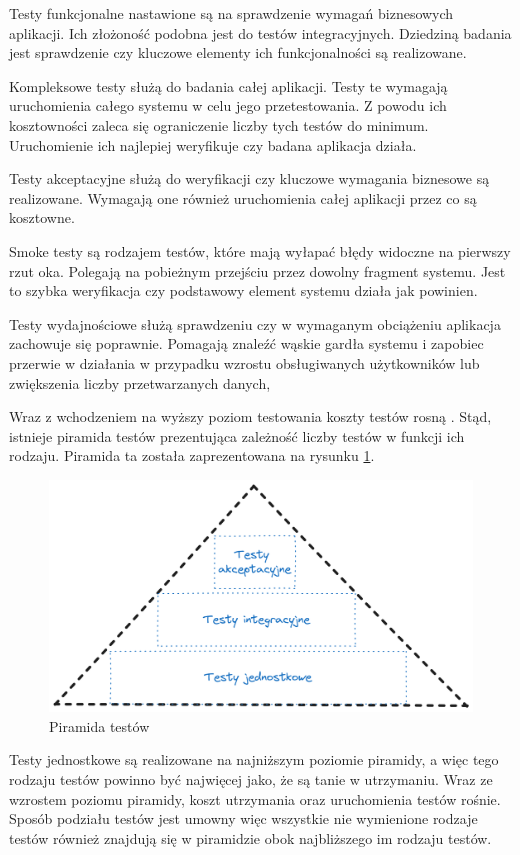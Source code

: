 Testy funkcjonalne nastawione są na sprawdzenie wymagań biznesowych aplikacji.
Ich złożoność podobna jest do testów integracyjnych.
Dziedziną badania jest sprawdzenie czy kluczowe elementy ich funkcjonalności są realizowane.

Kompleksowe testy służą do badania całej aplikacji.
Testy te wymagają uruchomienia całego systemu w celu jego przetestowania.
Z powodu ich kosztowności zaleca się ograniczenie liczby tych testów do minimum.
Uruchomienie ich najlepiej weryfikuje czy badana aplikacja działa.

Testy akceptacyjne służą do weryfikacji czy kluczowe wymagania biznesowe są realizowane.
Wymagają one również uruchomienia całej aplikacji przez co są kosztowne.

Smoke testy są rodzajem testów, które mają wyłapać błędy widoczne na pierwszy rzut oka.
Polegają na pobieżnym przejściu przez dowolny fragment systemu.
Jest to szybka weryfikacja czy podstawowy element systemu działa jak powinien.

Testy wydajnościowe służą sprawdzeniu czy w wymaganym obciążeniu aplikacja zachowuje się poprawnie.
Pomagają znaleźć wąskie gardła systemu i zapobiec przerwie w działania w przypadku wzrostu obsługiwanych użytkowników lub zwiększenia liczby przetwarzanych danych,

Wraz z wchodzeniem na wyższy poziom testowania koszty testów rosną \cite{testerzyPiramidaTestw}.
Stąd, istnieje piramida testów prezentująca zależność liczby testów w funkcji ich rodzaju.
Piramida ta została zaprezentowana na rysunku \ref{rys:test-pyramid}.
\begin{figure}[!hb]
	\centering \includegraphics[width=1\linewidth]{rysunki/test-pyramid.png}
	\caption{Piramida testów}
	\label{rys:test-pyramid}
\end{figure}
Testy jednostkowe są realizowane na najniższym poziomie piramidy, a więc tego rodzaju testów powinno być najwięcej jako, że są tanie w utrzymaniu.
Wraz ze wzrostem poziomu piramidy, koszt utrzymania oraz uruchomienia testów rośnie.
Sposób podziału testów jest umowny więc wszystkie nie wymienione rodzaje testów również znajdują się w piramidzie obok najbliższego im rodzaju testów.


